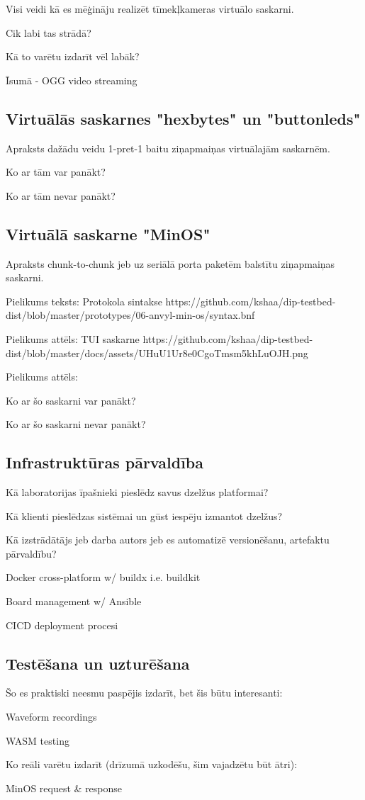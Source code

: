Visi veidi kā es mēģināju realizēt tīmekļkameras virtuālo saskarni.

Cik labi tas strādā?

Kā to varētu izdarīt vēl labāk?

Īsumā - OGG video streaming

\subsection{Virtuālās saskarnes "hexbytes" un "buttonleds"}

Apraksts dažādu veidu 1-pret-1 baitu ziņapmaiņas virtuālajām saskarnēm.

Ko ar tām var panākt?

Ko ar tām nevar panākt?

\subsection{Virtuālā saskarne "MinOS"}

Apraksts chunk-to-chunk jeb uz seriālā porta paketēm balstītu ziņapmaiņas saskarni.

Pielikums teksts: Protokola sintakse https://github.com/kshaa/dip-testbed-dist/blob/master/prototypes/06-anvyl-min-os/syntax.bnf  

Pielikums attēls: TUI saskarne https://github.com/kshaa/dip-testbed-dist/blob/master/docs/assets/UHuU1Ur8e0CgoTmsm5khLuOJH.png

Pielikums attēls: 

Ko ar šo saskarni var panākt?

Ko ar šo saskarni nevar panākt?

\subsection{Infrastruktūras pārvaldība}

Kā laboratorijas īpašnieki pieslēdz savus dzelžus platformai?

Kā klienti pieslēdzas sistēmai un gūst iespēju izmantot dzelžus?

Kā izstrādātājs jeb darba autors jeb es automatizē versionēšanu, artefaktu pārvaldību?

Docker cross-platform w/ buildx i.e. buildkit

Board management w/ Ansible

CICD deployment procesi

\subsection{Testēšana un uzturēšana}

Šo es praktiski neesmu paspējis izdarīt, bet šis būtu interesanti:

Waveform recordings

WASM testing

Ko reāli varētu izdarīt (drīzumā uzkodēšu, šim vajadzētu būt ātri):

MinOS request & response
